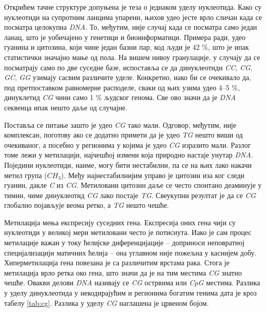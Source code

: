 \documentclass[12pt,oneside]{memoir}
\begin{document}
\begin{CJK}{UTF8}{ipxm}
Открићем тачне структуре допуњена је теза о једнаком уделу нуклеотида. Како су нуклеотиди на супротним ланцима упарени, њихов удео јесте врло сличан када се посматра целокупна \textit{DNA}. То, међутим, није случај када се посматра само један ланац, што је уобичајено у генетици и биоинформатици. Примера ради, удео гуанина и цитозина, који чине један базни пар, код људи је 42 \%, што је ипак статистички значајно мање од пола. На вишем нивоу гранулације, у случају да се посматрају само по две суседне базе, испоставља се да динуклеотиди \textit{CC}, \textit{CG}, \textit{GC}, \textit{GG} узимају сасвим различите уделе. Конкретно, иако би се очекивало да, под претпоставком равномерне расподеле, сваки од њих узима удео 4--5 \%, динуклетид \textit{CG} чини само 1 \% људског генома. Све ово значи да је \textit{DNA} секвенца ипак нешто даље од случајне.

Поставља се питање зашто је удео \textit{CG} тако мали. Одговор, међутим, није комплексан, поготову ако се додатно примети да је удео \textit{TG} нешто виши од очекиваног, а посебно у регионима у којима је удео \textit{CG} изразито мали. Разлог томе лежи у метилацији, најчешћој измени која природно настаје унутар \textit{DNA}. Поједини нуклеотиди, наиме, могу бити нестабилни, па се на њих лако накачи метил група ($CH_3$). Међу најнестабилнијим управо је цитозин иза ког следи гуанин, дакле \textit{C} из \textit{CG}. Метиловани цитозин даље се често спонтано деаминује у тимин, чиме динуклеотид \textit{CG} лако постаје \textit{TG}. Свеукупни резултат је да се \textit{CG} глобално појављује веома ретко, а \textit{TG} нешто чешће.

Метилација мења експресију суседних гена. Експресија оних гена чији су нуклеотиди у великој мери метиловани често је потиснута. Иако је сам процес метилације важан у току ћелијске диференцијације -- доприноси неповратној специјализацији матичних ћелија -- она углавном није пожељна у каснијем добу. Хиперметилација гена повезана је са различитим врстама рака. Стога је метилација врло ретка око гена, што значи да је на тим местима \textit{CG} знатно чешће. Овакви делови \textit{DNA} називају се \textit{CG} острвима или \textit{CpG} местима. Разлика у уделу динуклеотида у некодирајућим и регионима богатим генима дата је кроз табелу \ref{tab:cg}. Разлика у уделу \textit{CG} наглашена је црвеном бојом.


\end{CJK}
\end{document}
